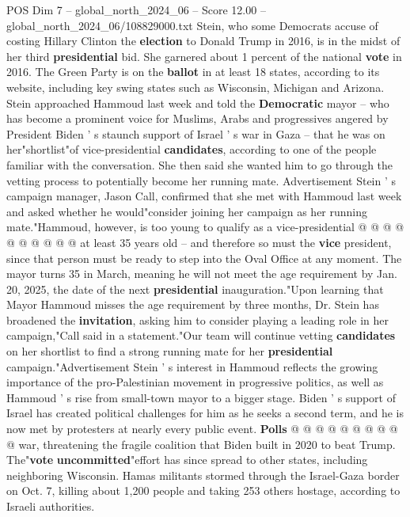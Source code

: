 \begin{textsample}{POS Dim 7 – global\_north\_2024\_06 – Score 12.00 – global\_north\_2024\_06/108829000.txt}  \label{ex:f7_pos_081}
Stein, who some Democrats accuse of costing Hillary Clinton the \textbf{election} to Donald Trump in 2016, is in the midst of her third \textbf{presidential} bid.
She garnered about 1 percent of the national \textbf{vote} in 2016.
The Green Party is on the \textbf{ballot} in at least 18 states, according to its website, including key swing states such as Wisconsin, Michigan and Arizona.
Stein approached Hammoud last week and told the \textbf{Democratic} mayor -- who has become a prominent voice for Muslims, Arabs and progressives angered by President Biden ' s staunch support of Israel ' s war in Gaza -- that he was on her"shortlist"of vice-presidential \textbf{candidates}, according to one of the people familiar with the conversation.
She then said she wanted him to go through the vetting process to potentially become her running mate.
Advertisement Stein ' s campaign manager, Jason Call, confirmed that she met with Hammoud last week and asked whether he would"consider joining her campaign as her running mate."Hammoud, however, is too young to qualify as a vice-presidential @ @ @ @ @ @ @ @ @ @ at least 35 years old -- and therefore so must the \textbf{vice} president, since that person must be ready to step into the Oval Office at any moment.
The mayor turns 35 in March, meaning he will not meet the age requirement by Jan. 20, 2025, the date of the next \textbf{presidential} inauguration."Upon learning that Mayor Hammoud misses the age requirement by three months, Dr.
Stein has broadened the \textbf{invitation}, asking him to consider playing a leading role in her campaign,"Call said in a statement."Our team will continue vetting \textbf{candidates} on her shortlist to find a strong running mate for her \textbf{presidential} campaign."Advertisement Stein ' s interest in Hammoud reflects the growing importance of the pro-Palestinian movement in progressive politics, as well as Hammoud ' s rise from small-town mayor to a bigger stage.
Biden ' s support of Israel has created political challenges for him as he seeks a second term, and he is now met by protesters at nearly every public event. \textbf{Polls} @ @ @ @ @ @ @ @ @ @ war, threatening the fragile coalition that Biden built in 2020 to beat Trump.
The"\textbf{vote} \textbf{uncommitted}"effort has since spread to other states, including neighboring Wisconsin.
Hamas militants stormed through the Israel-Gaza border on Oct. 7, killing about 1,200 people and taking 253 others hostage, according to Israeli authorities.

\end{textsample}
